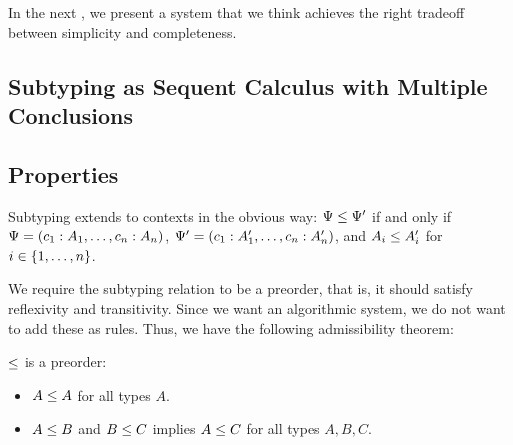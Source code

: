 In the next , we present a system that we think achieves the right tradeoff between simplicity and completeness.


\subsection{Subtyping as Sequent Calculus with Multiple Conclusions}
\label{subtyping-multi}




\subsection{Properties}

Subtyping extends to contexts in the obvious way: $\Psi \le \Psi'$ if and only if $\Psi = (c_1 : A_1, \ldots, c_n : A_n)$, $\Psi' = (c_1 : A_1', \ldots, c_n : A_n')$, and $A_i \le A_i'$ for $i \in \lbrace1, \ldots, n\rbrace$.

We require the subtyping relation to be a preorder, that is, it should satisfy reflexivity and transitivity. Since we want an algorithmic system, we do not want to add these as rules. Thus, we have the following admissibility theorem:

\begin{theorem}
  $\le$ is a preorder:
  \begin{itemize}
    \item $A \le A$ for all types $A$.
    \item $A \le B$ and $B \le C$ implies $A \le C$ for all types $A, B, C$.
  \end{itemize}
\end{theorem}

